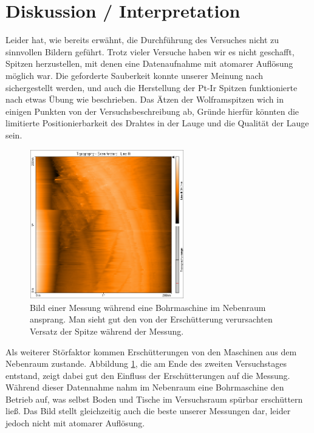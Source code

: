 \documentclass[10pt, a4paper]{article}
\begin{document}
\section{Diskussion / Interpretation}
\label{sec:Diskussion}

Leider hat, wie bereits erwähnt, die Durchführung des Versuches nicht zu sinnvollen Bildern geführt.
Trotz vieler Versuche haben wir es nicht geschafft, Spitzen herzustellen, mit denen eine Datenaufnahme mit atomarer Auflösung möglich war.
Die geforderte Sauberkeit konnte unserer Meinung nach sichergestellt werden, und auch die Herstellung der Pt-Ir Spitzen funktionierte nach etwas Übung wie beschrieben.
Das Ätzen der Wolframspitzen wich in einigen Punkten von der Versuchsbeschreibung ab, Gründe hierfür könnten die limitierte Positionierbarkeit des Drahtes in der Lauge und die Qualität der Lauge sein.

\begin{figure}[h]
\centering
\includegraphics[width=0.6\textwidth]{./grafiken/bohrer.png}
\caption{Bild einer Messung während eine Bohrmaschine im Nebenraum ansprang. Man sieht gut den von der Erschütterung verursachten Versatz der Spitze während der Messung.}
\label{fig:bohrer}
\end{figure}

Als weiterer Störfaktor kommen Erschütterungen von den Maschinen aus dem Nebenraum zustande. Abbildung \ref{fig:bohrer}, die am Ende des zweiten Versuchstages entstand, zeigt dabei gut den Einfluss der Erschütterungen auf die Messung.
Während dieser Datennahme nahm im Nebenraum eine Bohrmaschine den Betrieb auf, was selbst Boden und Tische im Versuchsraum spürbar erschüttern ließ.
Das Bild stellt gleichzeitig auch die beste unserer Messungen dar, leider jedoch nicht mit atomarer Auflösung.
\end{document}
